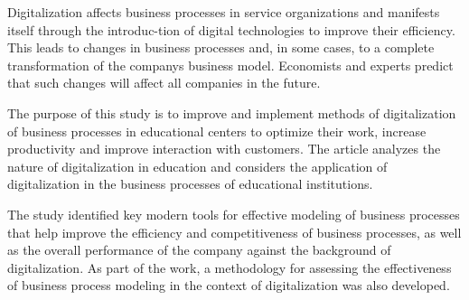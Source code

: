 Digitalization affects business processes in service organizations and
manifests itself through the introduc-tion of digital technologies to
improve their efficiency. This leads to changes in business processes
and, in some cases, to a complete transformation of the
company\textquotesingle s business model. Economists and experts predict
that such changes will affect all companies in the future.

The purpose of this study is to improve and implement methods of
digitalization of business processes in educational centers to optimize
their work, increase productivity and improve interaction with
customers. The article analyzes the nature of digitalization in
education and considers the application of digitalization in the
business processes of educational institutions.

The study identified key modern tools for effective modeling of business
processes that help improve the efficiency and competitiveness of
business processes, as well as the overall performance of the company
against the background of digitalization. As part of the work, a
methodology for assessing the effectiveness of business process modeling
in the context of digitalization was also developed.

